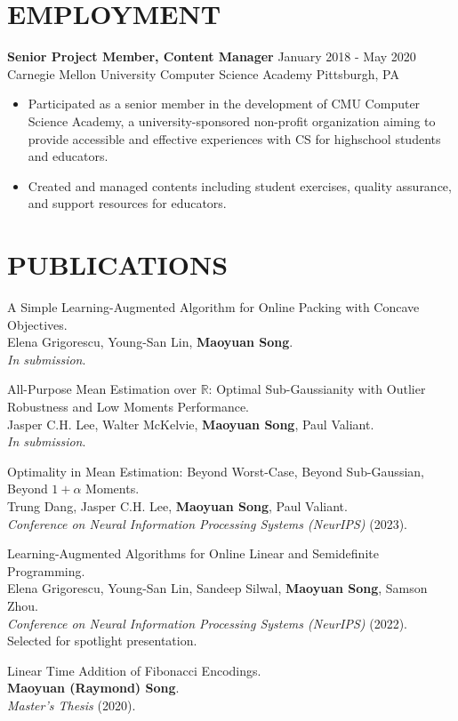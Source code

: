 \documentclass[margin, 10pt]{res} %
\begin{document}
\begin{resume}
\section{EMPLOYMENT}

{\bf Senior Project Member, Content Manager} \hfill January 2018 - May 2020 \\
Carnegie Mellon University Computer Science Academy \hfill Pittsburgh, PA

\begin{itemize}
\item Participated as a senior member in the development of CMU Computer Science Academy, a university-sponsored non-profit organization aiming to provide accessible and effective experiences with CS for highschool students and educators.
\item Created and managed contents including student exercises, quality assurance, and support resources for educators.
\end{itemize} 


\section{PUBLICATIONS}
\begin{etaremune}
\item A Simple Learning-Augmented Algorithm for Online Packing with Concave Objectives.\\
Elena Grigorescu, Young-San Lin, {\bf Maoyuan Song}.\\
\emph{In submission}.
\item All-Purpose Mean Estimation over $\mathbb{R}$: Optimal Sub-Gaussianity with Outlier Robustness and Low Moments Performance.\\
Jasper C.H. Lee, Walter McKelvie, {\bf Maoyuan Song}, Paul Valiant.\\
\emph{In submission}.
\item Optimality in Mean Estimation: Beyond Worst-Case, Beyond Sub-Gaussian, Beyond $1 + \alpha$ Moments.\\
Trung Dang, Jasper C.H. Lee, {\bf Maoyuan Song}, Paul Valiant.\\
\emph{Conference on Neural Information Processing Systems (NeurIPS)} (2023).
\item Learning-Augmented Algorithms for Online Linear and Semidefinite Programming.\\
Elena Grigorescu, Young-San Lin, Sandeep Silwal, {\bf Maoyuan Song}, Samson Zhou.\\
\emph{Conference on Neural Information Processing Systems (NeurIPS)} (2022). Selected for spotlight presentation.
\item Linear Time Addition of Fibonacci Encodings.\\
{\bf Maoyuan (Raymond) Song}.\\
\emph{Master's Thesis} (2020). 
\end{etaremune}



\end{resume}
\end{document}
